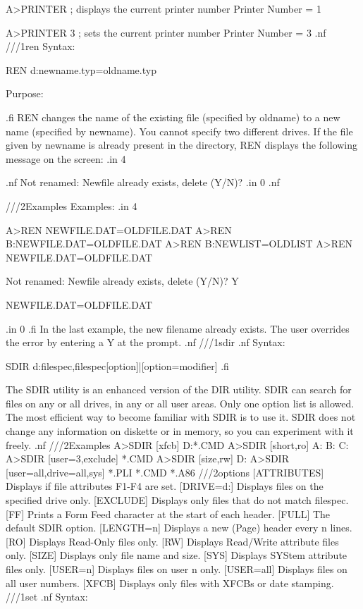        A>PRINTER            ; displays the current printer number
       Printer Number = 1

       A>PRINTER 3          ; sets the current printer number
       Printer Number = 3
.nf
///1ren
Syntax:

REN {d:}newname{.typ}=oldname{.typ}

Purpose:

.fi
REN changes the name of the existing file (specified by oldname) to 
a new name (specified by newname). You cannot specify two different
drives. If the file given by newname is already present in the
directory, REN displays the following message on the screen:
.in 4

.nf
Not renamed: Newfile already exists, delete (Y/N)?
.in 0
.nf

///2Examples
Examples:
.in 4

A>REN NEWFILE.DAT=OLDFILE.DAT
A>REN B:NEWFILE.DAT=OLDFILE.DAT
A>REN B:NEWLIST=OLDLIST
A>REN NEWFILE.DAT=OLDFILE.DAT

Not renamed: Newfile already exists, delete (Y/N)? Y

NEWFILE.DAT=OLDFILE.DAT

.in 0
.fi
In the last example, the new filename already exists. The user
overrides the error by entering a Y at the prompt. 
.nf
///1sdir
.nf
Syntax:

SDIR {d:}{filespec}{,filespec}{[option]|[option=modifier]}
.fi

The SDIR utility is an enhanced version of the DIR utility.
SDIR can search for files on any or all drives, in any or all 
user areas. Only one option list is allowed. The most efficient 
way to become familiar with SDIR is to use it. SDIR does not 
change any information on diskette or in memory, so you can 
experiment with it freely. 
.nf
///2Examples 
A>SDIR [xfcb] D:*.CMD
A>SDIR [short,ro] A: B: C:
A>SDIR [user=3,exclude] *.CMD 
A>SDIR [size,rw] D:
A>SDIR [user=all,drive=all,sys] *.PLI *.CMD *.A86
///2options
[ATTRIBUTES]  Displays if file attributes F1-F4 are set.
[DRIVE=d:]    Displays files on the specified drive only.
[EXCLUDE]     Displays only files that do not match filespec.
[FF]          Prints a Form Feed character at the start of each header.
[FULL]        The default SDIR option. 
[LENGTH=n]    Displays a new (Page) header every n lines.
[RO]          Displays Read-Only files only.
[RW]          Displays Read/Write attribute files only.
[SIZE]        Displays only file name and size.
[SYS]         Displays SYStem attribute files only.
[USER=n]      Displays files on user n only.
[USER=all]    Displays files on all user numbers.
[XFCB]        Displays only files with XFCBs or date stamping.
///1set
.nf
Syntax:

